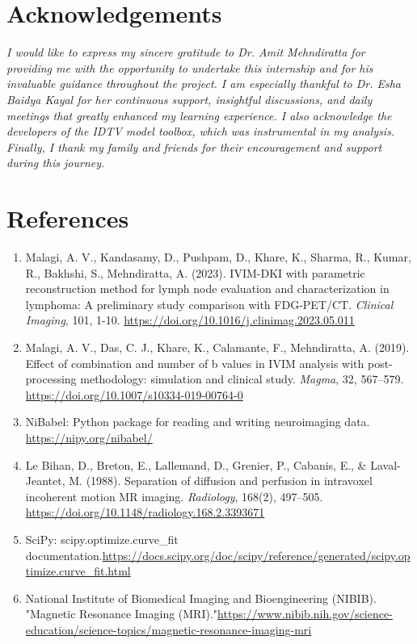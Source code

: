 \documentclass[a4paper,12pt]{article}
\begin{document}
\section*{Acknowledgements}
\textit{
I would like to express my sincere gratitude to Dr. Amit Mehndiratta for providing me with the opportunity to undertake this internship and for his invaluable guidance throughout the project. I am especially thankful to Dr. Esha Baidya Kayal for her continuous support, insightful discussions, and daily meetings that greatly enhanced my learning experience. I also acknowledge the developers of the IDTV model toolbox, which was instrumental in my analysis. Finally, I thank my family and friends for their encouragement and support during this journey.
}


\section*{References}
\begin{enumerate}
    \item Malagi, A. V., Kandasamy, D., Pushpam, D., Khare, K., Sharma, R., Kumar, R., Bakhshi, S., Mehndiratta, A. (2023). IVIM-DKI with parametric reconstruction method for lymph node evaluation and characterization in lymphoma: A preliminary study comparison with FDG-PET/CT. \textit{Clinical Imaging}, 101, 1-10. \url{https://doi.org/10.1016/j.clinimag.2023.05.011}
    \item Malagi, A. V., Das, C. J., Khare, K., Calamante, F., Mehndiratta, A. (2019). Effect of combination and number of b values in IVIM analysis with post-processing methodology: simulation and clinical study. \textit{Magma}, 32, 567–579. \url{https://doi.org/10.1007/s10334-019-00764-0}
    \item NiBabel: Python package for reading and writing neuroimaging data. \url{https://nipy.org/nibabel/}
    \item Le Bihan, D., Breton, E., Lallemand, D., Grenier, P., Cabanis, E., & Laval-Jeantet, M. (1988). Separation of diffusion and perfusion in intravoxel incoherent motion MR imaging. \textit{Radiology}, 168(2), 497–505. \url{https://doi.org/10.1148/radiology.168.2.3393671}
    \item SciPy: scipy.optimize.curve\_fit documentation.\url{https://docs.scipy.org/doc/scipy/reference/generated/scipy.optimize.curve_fit.html} 
    \item National Institute of Biomedical Imaging and Bioengineering (NIBIB). "Magnetic Resonance Imaging (MRI)."\url{https://www.nibib.nih.gov/science-education/science-topics/magnetic-resonance-imaging-mri} 
\end{enumerate}
\end{document}
